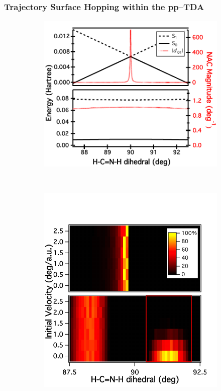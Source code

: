 \documentclass[usepdftitle=false,10pt]{beamer}
\begin{document}
\begin{frame}
  \frametitle{Trajectory Surface Hopping within the pp--TDA}
  \vspace{-0.7cm}
  \begin{figure}
  \begin{subfigure}[b]{0.40\textwidth}
  \includegraphics[width=\textwidth]{gs_es_dercp} 
  \caption{ }
  \label{fig:gs_es_dercp}
  \end{subfigure} $\quad$
  \begin{subfigure}[b]{0.40\textwidth}
  \includegraphics[width=\textwidth]{stacked_hops} 

\end{subfigure}
\end{figure}
\end{frame}
\end{document}

